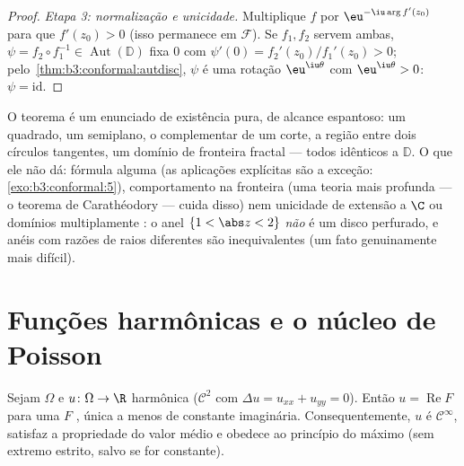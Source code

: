 \begin{proof}
\emph{Etapa 3: normalização e unicidade.} Multiplique $f$ por $\eu^{-\iu\arg f'(z_0)}$
para que $f'(z_0) > 0$ (isso permanece em $\mathcal F$). Se $f_1, f_2$ servem ambas, $\psi =
f_2\circ f_1^{-1} \in \operatorname{Aut}(\mathbb D)$
fixa $0$ com $\psi'(0) = f_2'(z_0)/f_1'(z_0) > 0$; pelo~\cref{thm:b3:conformal:autdisc}, $\psi$ é uma rotação
$\eu^{\iu\theta}$ com $\eu^{\iu\theta} > 0$: $\psi =
\mathrm{id}$.
\end{proof}

\begin{remark}\label{rem:b3:conformal:rmtscope}
O teorema é um enunciado de existência pura, de alcance espantoso: um
quadrado, um semiplano, o complementar de um corte, a região entre dois
círculos tangentes, um domínio de fronteira fractal --- todos
 idênticos a $\mathbb D$. O que ele não dá: fórmula alguma (as
aplicações explícitas são a exceção: \cref{exo:b3:conformal:5}), comportamento na
fronteira (uma teoria mais profunda --- o teorema de Carathéodory ---
cuida disso) nem unicidade de extensão a $\C$ ou domínios
multiplamente : o anel $\{1 < \abs z < 2\}$ \emph{não} é  um disco
perfurado, e anéis com razões de raios diferentes são inequivalentes
(um fato genuinamente mais difícil).
\end{remark}

\section{Funções harmônicas e o núcleo de Poisson}

\begin{proposition}\label{prop:b3:conformal:harmonicholo}
Sejam $\Omega$  e $u \colon \Omega \to \R$
harmônica ($\mathcal C^2$ com $\Delta u = u_{xx} + u_{yy} = 0$). Então $u =
\operatorname{Re}F$ para
uma $F$ , única a menos de constante imaginária.
Consequentemente, $u$ é $\mathcal C^\infty$, satisfaz a propriedade do valor médio
e obedece ao princípio do máximo (sem extremo  estrito, salvo se
for constante).
\end{proposition}

